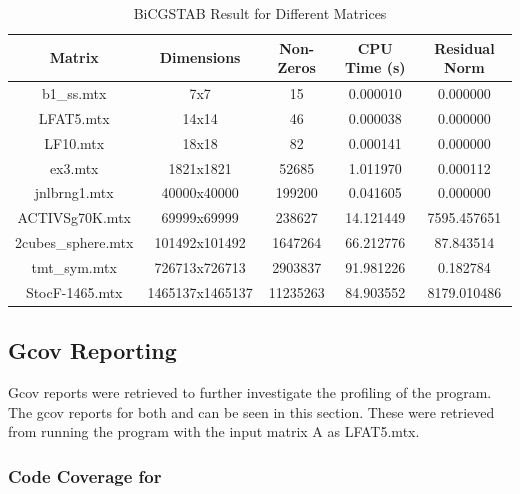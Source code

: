 \documentclass[12pt]{article}
\begin{document}
\begin{table}[h]
  \centering
  \caption{BiCGSTAB Result for Different Matrices}
  \begin{tabular}{ccccc} %
    \toprule
    \textbf{Matrix} & \textbf{Dimensions} & \textbf{Non-Zeros} & \textbf{CPU Time (s)} & \textbf{Residual Norm} \\
    \midrule
    b1\_ss.mtx         & 7x7             & 15       & 0.000010  & 0.000000 \\
    LFAT5.mtx          & 14x14           & 46       & 0.000038  & 0.000000 \\
    LF10.mtx           & 18x18           & 82       & 0.000141  & 0.000000 \\
    ex3.mtx            & 1821x1821       & 52685    & 1.011970  & 0.000112 \\
    jnlbrng1.mtx       & 40000x40000     & 199200   & 0.041605  & 0.000000 \\
    ACTIVSg70K.mtx     & 69999x69999     & 238627   & 14.121449 & 7595.457651 \\
    2cubes\_sphere.mtx & 101492x101492   & 1647264  & 66.212776 & 87.843514 \\
    tmt\_sym.mtx       & 726713x726713   & 2903837  & 91.981226 & 0.182784 \\
    StocF-1465.mtx     & 1465137x1465137 & 11235263 & 84.903552 & 8179.010486 \\
    \bottomrule
  \end{tabular}
\end{table}

\subsection{Gcov Reporting}

Gcov reports were retrieved to further investigate the profiling of the program. The gcov reports for both  and  can be seen in this section. These were retrieved from running the program with the input matrix A as LFAT5.mtx.

\subsubsection{Code Coverage for }
\end{document}
